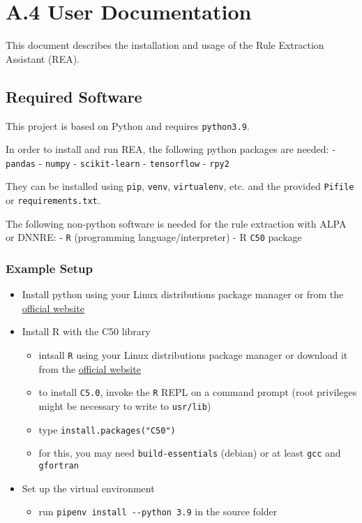 \documentclass[
]{article}
\author{}
\date{}
\providecommand{\tightlist}{%
  \setlength{\itemsep}{0pt}\setlength{\parskip}{0pt}}
\begin{document}
	
\setcounter{page}{28}

\hypertarget{user-documentation}{%
\section{A.4   User Documentation}\label{user-documentation}}

This document describes the installation and usage of the Rule
Extraction Assistant (REA).

\hypertarget{required-software}{%
\subsection{Required Software}\label{required-software}}

This project is based on Python and requires \texttt{python3.9}.

In order to install and run REA, the following python packages are
needed: - \texttt{pandas} - \texttt{numpy} - \texttt{scikit-learn} -
\texttt{tensorflow} - \texttt{rpy2}

They can be installed using \texttt{pip}, \texttt{venv},
\texttt{virtualenv}, etc. and the provided \texttt{Pifile} or
\texttt{requirements.txt}.

The following non-python software is needed for the rule extraction with
ALPA or DNNRE: - \texttt{R} (programming language/interpreter) - R
\texttt{C50} package

\hypertarget{example-setup}{%
\subsubsection{Example Setup}\label{example-setup}}

\begin{itemize}
\tightlist
\item
  Install python using your Linux distributions package manager or from
  the \href{https://www.python.org/}{official website}
\item
  Install R with the C50 library

  \begin{itemize}
  \tightlist
  \item
    intsall \texttt{R} using your Linux distributions package manager or
    download it from the
    \href{https://www.r-project.org/about.html}{official website}
  \item
    to install \texttt{C5.0}, invoke the \texttt{R} REPL on a command
    prompt (root privileges might be necessary to write to
    \texttt{usr/lib})
  \item
    type \texttt{install.packages("C50")}
  \item
    for this, you may need \texttt{build-essentials} (debian) or at
    least \texttt{gcc} and \texttt{gfortran}
  \end{itemize}
\item
  Set up the virtual environment

  \begin{itemize}
  \tightlist
  \item
    run \texttt{pipenv\ install\ -\/-python\ 3.9} in the source folder
  \end{itemize}
\end{itemize}
\end{document}
